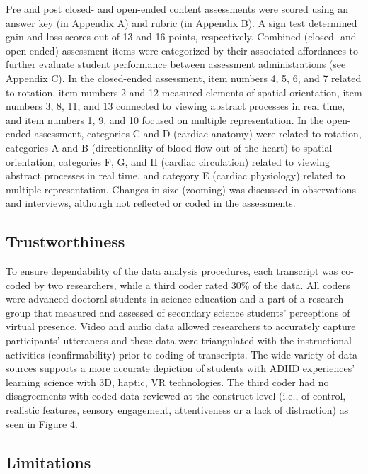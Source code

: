 \documentclass[11.5pt]{sig-alternate} %
\begin{document}
\begin{large}
Pre and post closed- and open-ended content assessments were scored using an answer key (in Appendix A) and rubric (in Appendix B). A sign test determined gain and loss scores out of 13 and 16 points, respectively. Combined (closed- and open-ended) assessment items were categorized by their associated affordances to further evaluate student performance between assessment administrations (see Appendix C). In the closed-ended assessment, item numbers 4, 5, 6, and 7 related to rotation, item numbers 2 and 12 measured elements of spatial orientation, item numbers 3, 8, 11, and 13 connected to viewing abstract processes in real time, and item numbers 1, 9, and 10 focused on multiple representation. In the open-ended assessment, categories C and D (cardiac anatomy) were related to rotation, categories A and B (directionality of blood flow out of the heart) to spatial orientation, categories F, G, and H (cardiac circulation) related to viewing abstract processes in real time, and category E (cardiac physiology) related to multiple representation. Changes in size (zooming) was discussed in observations and interviews, although not reflected or coded in the assessments. 	

\subsection*{Trustworthiness}

To ensure dependability of the data analysis procedures, each transcript was co-coded by two researchers, while a third coder rated 30\% of the data. All coders were advanced doctoral students in science education and a part of a research group that measured and assessed of secondary science students’ perceptions of virtual presence. Video and audio data allowed researchers to accurately capture participants’ utterances and these data were triangulated with the instructional activities (confirmability) prior to coding of transcripts. The wide variety of data sources supports a more accurate depiction of students with ADHD experiences’ learning science with 3D, haptic, VR technologies.  The third coder had no disagreements with coded data reviewed at the construct level (i.e., of control, realistic features, sensory engagement, attentiveness or a lack of distraction) as seen in Figure 4. 

\subsection*{Limitations}


\end{large}
\end{document}
